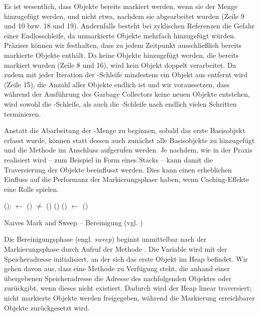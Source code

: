 
Es ist wesentlich, dass Objekte bereits markiert werden, wenn sie der Menge  hinzugefügt werden, und nicht etwa, nachdem sie abgearbeitet wurden (Zeile 9 und 10 bzw. 18 und 19).
Andernfalls besteht bei zyklischen Referenzen die Gefahr einer Endlosschleife, da unmarkierte Objekte mehrfach hinzugefügt würden.
Präziser können wir festhalten, dass  zu jedem Zeitpunkt ausschließlich bereits markierte Objekte enthält.
Da keine Objekte hinzugefügt werden, die bereits markiert wurden (Zeile 8 und 16), wird kein Objekt doppelt verarbeitet.
Da zudem mit jeder Iteration der \WHILE-Schleife mindestens ein Objekt aus  entfernt wird (Zeile 15), die Anzahl aller Objekte endlich ist und wir voraussetzen, dass während der Ausführung des Garbage Collectors keine neuen Objekte entstehen, wird sowohl die \WHILE-Schleife, als auch die \FOREACH-Schleife nach endlich vielen Schritten terminieren.

Anstatt die Abarbeitung der -Menge zu beginnen, sobald das erste Basisobjekt erfasst wurde, können statt dessen auch zunächst alle Basisobjekte zu  hinzugefügt und die Methode  im Anschluss aufgerufen werden.
Je nachdem, wie  in der Praxis realisiert wird -- zum Beispiel in Form eines Stacks -- kann damit die Traversierung der Objekte beeinflusst werden.
Dies kann einen erheblichen Einfluss auf die Performanz der Markierungsphase haben, wenn Caching-Effekte eine Rolle spielen. 

\begin{algorithm}
\begin{algorithmic}[1]
	\State {}():
	\State \quad {} $\gets$ ()
	\State \quad \WHILE {} $\neq$ \Null
	\State \quad \quad \IF {}()
	\State \quad \quad \quad {}()
	\State \quad \quad \ELSE {}()
	\State \quad \quad {} $\gets$ ()
\end{algorithmic}
\caption[Naives Mark and Sweep -- Bereinigung]{Naives Mark and Sweep -- Bereinigung (vgl. \cite[Kap. 2.2]{jones-lins})}
\label{algo:naive-sweep}
\end{algorithm}

Die Bereinigungsphase (engl. \textit{sweep}) beginnt unmittelbar nach der Markierungsphase durch Aufruf der Methode .
Die Variable  wird mit der Speicheradresse initialisiert, an der sich das erste Objekt im Heap befindet.
Wir gehen davon aus, dass eine Methode  zu Verfügung steht, die anhand einer übergebenen Speicheradresse die Adresse des nachfolgenden Objektes oder \Null zurückgibt, wenn dieses nicht existiert.
Dadurch wird der Heap linear traversiert; nicht markierte Objekte werden freigegeben, während die Markierung erreichbarer Objekte zurückgesetzt wird.

